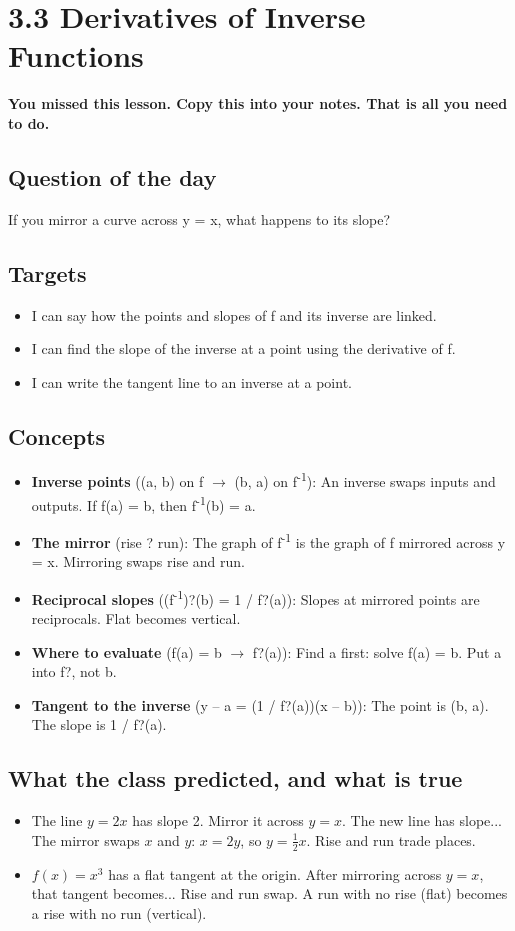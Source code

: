 \documentclass[11pt]{article}
\begin{document}
\section*{3.3 Derivatives of Inverse Functions}
\textbf{You missed this lesson. Copy this into your notes. That is all you need to do.}\par\medskip
\subsection*{Question of the day}
If you mirror a curve across y = x, what happens to its slope?\par
\subsection*{Targets}\begin{itemize}\item I can say how the points and slopes of f and its inverse are linked.
\item I can find the slope of the inverse at a point using the derivative of f.
\item I can write the tangent line to an inverse at a point.\end{itemize}
\subsection*{Concepts}\begin{itemize}
\item \textbf{Inverse points} ((a, b) on f  $\rightarrow$  (b, a) on f\textsuperscript{-1}): An inverse swaps inputs and outputs. If f(a) = b, then f\textsuperscript{-1}(b) = a.
\item \textbf{The mirror} (rise ? run): The graph of f\textsuperscript{-1} is the graph of f mirrored across y = x. Mirroring swaps rise and run.
\item \textbf{Reciprocal slopes} ((f\textsuperscript{-1})?(b) = 1 / f?(a)): Slopes at mirrored points are reciprocals. Flat becomes vertical.
\item \textbf{Where to evaluate} (f(a) = b  $\rightarrow$  f?(a)): Find a first: solve f(a) = b. Put a into f?, not b.
\item \textbf{Tangent to the inverse} (y -- a = (1 / f?(a))(x -- b)): The point is (b, a). The slope is 1 / f?(a).
\end{itemize}
\subsection*{What the class predicted, and what is true}\begin{itemize}
\item The line $y=2x$ has slope 2. Mirror it across $y=x$. The new line has slope...  The mirror swaps $x$ and $y$: $x=2y$, so $y=\tfrac12x$. Rise and run trade places.
\item $f(x)=x^3$ has a flat tangent at the origin. After mirroring across $y=x$, that tangent becomes...  Rise and run swap. A run with no rise (flat) becomes a rise with no run (vertical).
\end{itemize}
\end{document}
